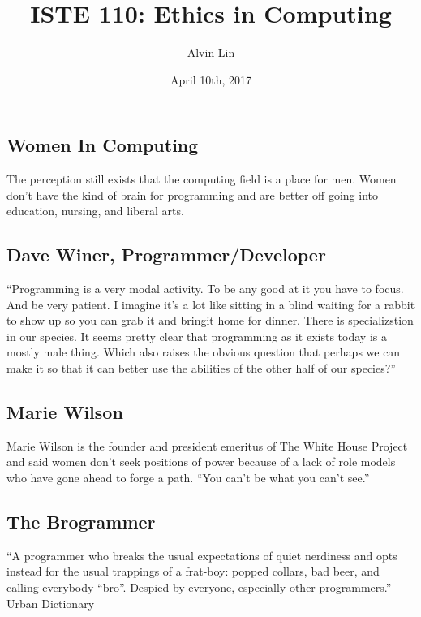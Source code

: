 \documentclass[letterpaper, 12pt]{article}
\title{ISTE 110: Ethics in Computing}
\author{Alvin Lin}
\date{April 10th, 2017}
\begin{document}
\maketitle

\subsection*{Women In Computing}
The perception still exists that the computing field is a place for men. Women
don't have the kind of brain for programming and are better off going into
education, nursing, and liberal arts.

\subsection*{Dave Winer, Programmer/Developer}
``Programming is a very modal activity. To be any good at it you have to focus.
And be very patient. I imagine it's a lot like sitting in a blind waiting for a
rabbit to show up so you can grab it and bringit home for dinner. There is
specializstion in our species. It seems pretty clear that programming as it
exists today is a mostly male thing. Which also raises the obvious question
that perhaps we can make it so that it can better use the abilities of the
other half of our species?''

\subsection*{Marie Wilson}
Marie Wilson is the founder and president emeritus of The White House Project
and said women don't seek positions of power because of a lack of role models
who have gone ahead to forge a path. ``You can't be what you can't see.''

\subsection*{The Brogrammer}
``A programmer who breaks the usual expectations of quiet nerdiness and opts
instead for the usual trappings of a frat-boy: popped collars, bad beer, and
calling everybody ``bro''. Despied by everyone, especially other programmers.''
- Urban Dictionary
\end{document}
